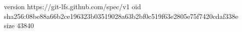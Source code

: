 version https://git-lfs.github.com/spec/v1
oid sha256:08be88a66b2ce196323b03519028a63b2bf0c519f63e2805e75f7420cdaf338e
size 43840
